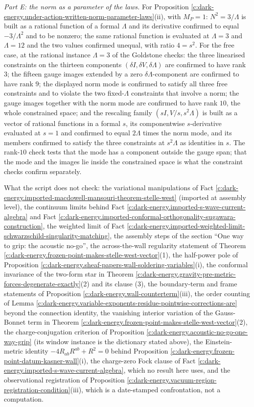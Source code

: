 \documentclass[11pt]{article}
\theoremstyle{definition}
\theoremstyle{plain}
\begin{document}
\emph{Part E: the norm as a parameter of the laws.} For Proposition \ref{c:dark-energy.under-action-written-norm-parameter-laws}(ii), with $M_P = 1$: $N^2 = 3/\Lambda$ is built as a rational function of a formal $\Lambda$ and its derivative confirmed to equal $-3/\Lambda^2$ and to be nonzero; the same rational function is evaluated at $\Lambda = 3$ and $\Lambda = 12$ and the two values confirmed unequal, with ratio $4 = s^2$. For the free case, at the rational instance $\Lambda = 3$ of the Goldstone checks: the three linearised constraints on the thirteen components $(\delta I, \delta V, \delta\Lambda)$ are confirmed to have rank $3$; the fifteen gauge images extended by a zero $\delta\Lambda$-component are confirmed to have rank $9$; the displayed norm mode is confirmed to satisfy all three free constraints and to violate the two fixed-$\Lambda$ constraints that involve a norm; the gauge images together with the norm mode are confirmed to have rank $10$, the whole constrained space; and the rescaling family $(sI, V/s, s^2\Lambda)$ is built as a vector of rational functions in a formal $s$, its componentwise $s$-derivative evaluated at $s = 1$ and confirmed to equal $2\Lambda$ times the norm mode, and its members confirmed to satisfy the three constraints at $s^2\Lambda$ as identities in $s$. The rank-$10$ check tests that the mode has a component outside the gauge span; that the mode and the images lie inside the constrained space is what the constraint checks confirm separately.

What the script does not check: the variational manipulations of Fact \ref{c:dark-energy.imported-macdowell-mansouri-theorem-stelle-west} (imported at assembly level), the continuum limits behind Fact \ref{c:dark-energy.imported-s-wave-current-algebra} and Fact \ref{c:dark-energy.imported-conformal-orthogonality-sugawara-construction}, the weighted limit of Fact \ref{c:dark-energy.imported-weighted-limit-schwarzschild-singularity-matching}, the assembly steps of the section ``One way to grip: the acoustic no-go'', the across-the-wall regularity statement of Theorem \ref{c:dark-energy.frozen-point-makes-stelle-west-vector}(1), the half-power pole of Proposition \ref{c:dark-energy.sheaf-papers-wall-soldering-variables}(i), the conformal invariance of the two-form star in Theorem \ref{c:dark-energy.gravity-pre-metric-forces-degenerate-exactly}(2) and its clause (3), the boundary-term and frame statements of Proposition \ref{c:dark-energy.wall-counterterm}(iii), the order counting of Lemma \ref{c:dark-energy.variable-exponents-residue-pointwise-corrections-are} beyond the connection identity, the vanishing interior variation of the Gauss-Bonnet term in Theorem \ref{c:dark-energy.frozen-point-makes-stelle-west-vector}(2), the charge-conjugation criterion of Proposition \ref{c:dark-energy.acoustic-no-go-one-way-grip} (its window instance is the dictionary stated above), the Einstein-metric identity $-4R_{ab}R^{ab} + R^2 = 0$ behind Proposition \ref{c:dark-energy.frozen-point-datum-kasner-wall}(i), the charge-zero Fock clause of Fact \ref{c:dark-energy.imported-s-wave-current-algebra}, which no result here uses, and the observational registration of Proposition \ref{c:dark-energy.vacuum-region-registration-condition}(iii), which is a date-stamped confrontation, not a computation.
\end{document}
